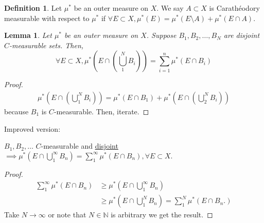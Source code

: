 \documentclass{report}
\newcommand{\N}{\mathbb{N}}
\newtheorem{lemma}[theorem]{Lemma}
\theoremstyle{definition}
\newtheorem{definition}[theorem]{Definition}
\theoremstyle{remark}
\begin{document}
\begin{definition}
Let $\mu^*$ be an outer measure on $X$. We say $A \subset X$ is Carathéodory measurable with respect to $\mu^*$ if $\forall E \subset X, \mu^*(E) = \mu^*(E \setminus A) + \mu^*(E \cap A).$ 
\end{definition}
\begin{lemma}
Let $\mu^*$ be an outer measure on $X$. Suppose $B_1, B_2, \ldots, B_N$ are disjoint $C$-measurable sets. Then,
\[
\forall E \subset X, \mu^*\left(E \cap \left(\bigcup_{1}^N B_i\right)\right) = \sum_{i=1}^n \mu^*(E \cap B_i)
\]
\end{lemma}
\begin{proof}
\begin{align*}
\mu^*\left(E \cap \left(\bigcup_1^N B_i\right)\right) = \mu^*(E \cap B_1) +  \mu^*\left(E \cap \left(\bigcup_2^N B_i\right)\right)
\end{align*}
because $B_1$ is $C$-measurable.
Then, iterate.
\end{proof}

Improved version: 

$B_1, B_2, \ldots$ $C$-measurable and \underline{disjoint} $\implies \mu^*\left(E \cap \bigcup_1^\infty B_n\right) = \sum_1^\infty \mu^*\left(E \cap B_n\right), \forall E \subset X.$
\begin{proof}
\begin{align*}
\sum_1^\infty \mu^*(E \cap B_n) & \geq \mu^*\left(E \cap \bigcup_1^\infty B_n\right) \\
& \geq \mu^*\left(E \cap \bigcup_1^N B_n \right) = \sum_1^N \mu^*(E \cap B_n.)
\end{align*}
Take $N \to \infty$ or note that $N \in \N$ is arbitrary we get the result.
\end{proof}
\end{document}
